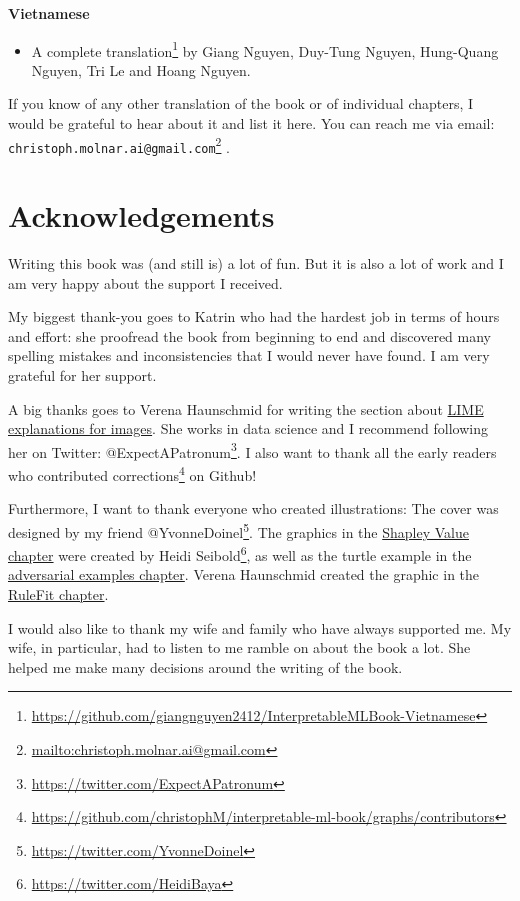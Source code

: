 \documentclass[12pt,]{krantz}
\providecommand{\tightlist}{%
  \setlength{\itemsep}{0pt}\setlength{\parskip}{0pt}}
\renewcommand{\href}[2]{#2\footnote{\url{#1}}}
\begin{document}
\textbf{Vietnamese}

\begin{itemize}
\tightlist
\item
  \href{https://github.com/giangnguyen2412/InterpretableMLBook-Vietnamese}{A
  complete translation} by Giang Nguyen, Duy-Tung Nguyen, Hung-Quang
  Nguyen, Tri Le and Hoang Nguyen.
\end{itemize}

If you know of any other translation of the book or of individual
chapters, I would be grateful to hear about it and list it here. You can
reach me via email:
\href{mailto:christoph.molnar.ai@gmail.com}{\nolinkurl{christoph.molnar.ai@gmail.com}}
.

\chapter{Acknowledgements}\label{acknowledgements}

Writing this book was (and still is) a lot of fun. But it is also a lot
of work and I am very happy about the support I received.

My biggest thank-you goes to Katrin who had the hardest job in terms of
hours and effort: she proofread the book from beginning to end and
discovered many spelling mistakes and inconsistencies that I would never
have found. I am very grateful for her support.

A big thanks goes to Verena Haunschmid for writing the section about
\protect\hyperlink{images-lime}{LIME explanations for images}. She works
in data science and I recommend following her on Twitter:
\href{https://twitter.com/ExpectAPatronum}{@ExpectAPatronum}. I also
want to thank all the
\href{https://github.com/christophM/interpretable-ml-book/graphs/contributors}{early
readers who contributed corrections} on Github!

Furthermore, I want to thank everyone who created illustrations: The
cover was designed by my friend
\href{https://twitter.com/YvonneDoinel}{@YvonneDoinel}. The graphics in
the \protect\hyperlink{shapley}{Shapley Value chapter} were created by
\href{https://twitter.com/HeidiBaya}{Heidi Seibold}, as well as the
turtle example in the \protect\hyperlink{adversarial}{adversarial
examples chapter}. Verena Haunschmid created the graphic in the
\protect\hyperlink{rulefit}{RuleFit chapter}.

I would also like to thank my wife and family who have always supported
me. My wife, in particular, had to listen to me ramble on about the book
a lot. She helped me make many decisions around the writing of the book.
\end{document}
